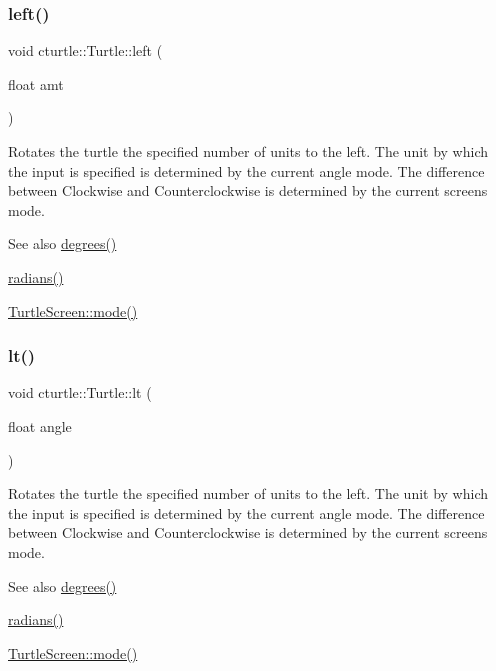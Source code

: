 \subsubsection{\texorpdfstring{left()}{left()}}
{\footnotesize\ttfamily void cturtle\+::\+Turtle\+::left (\begin{DoxyParamCaption}\item[{float}]{amt }\end{DoxyParamCaption})}



Rotates the turtle the specified number of units to the left. The unit by which the input is specified is determined by the current angle mode. The difference between Clockwise and Counterclockwise is determined by the current screen\textquotesingle{}s mode. 

\begin{DoxySeeAlso}{See also}
\hyperlink{classcturtle_1_1Turtle_aa68704b24017c6a8cda41ff292ecafde}{degrees()} 

\hyperlink{classcturtle_1_1Turtle_a9c266e318f05dc5d45ddbeb830a373fa}{radians()} 

\hyperlink{classcturtle_1_1InteractiveTurtleScreen_a1c666afe65211cf9eedaffa17206a697}{Turtle\+Screen\+::mode()} 
\end{DoxySeeAlso}
\mbox{\label{classcturtle_1_1Turtle_a4858ca94ff49171c615d319a307acb8d}} 
\subsubsection{\texorpdfstring{lt()}{lt()}}
{\footnotesize\ttfamily void cturtle\+::\+Turtle\+::lt (\begin{DoxyParamCaption}\item[{float}]{angle }\end{DoxyParamCaption})\hspace{0.3cm}{\ttfamily [inline]}}



Rotates the turtle the specified number of units to the left. The unit by which the input is specified is determined by the current angle mode. The difference between Clockwise and Counterclockwise is determined by the current screen\textquotesingle{}s mode. 

\begin{DoxySeeAlso}{See also}
\hyperlink{classcturtle_1_1Turtle_aa68704b24017c6a8cda41ff292ecafde}{degrees()} 

\hyperlink{classcturtle_1_1Turtle_a9c266e318f05dc5d45ddbeb830a373fa}{radians()} 

\hyperlink{classcturtle_1_1InteractiveTurtleScreen_a1c666afe65211cf9eedaffa17206a697}{Turtle\+Screen\+::mode()} 
\end{DoxySeeAlso}
\mbox{\label{classcturtle_1_1Turtle_a9fb220cdbffecdaaa8f8a722ef624eb8}} 
